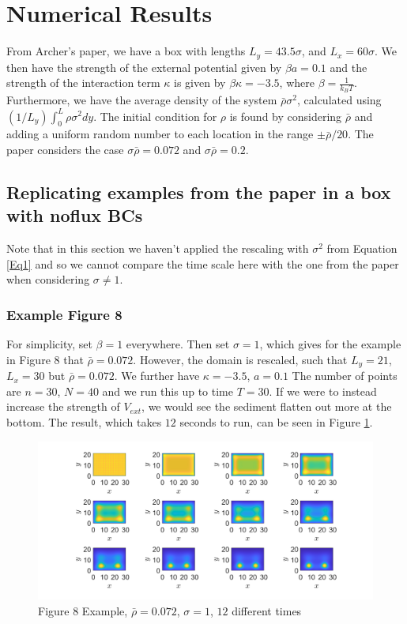 \documentclass[11pt, a4paper]{article}
\theoremstyle{definition}
\begin{document}
\section{Numerical Results}
From Archer's paper, we have a box with lengths $L_y = 43.5 \sigma$, and $L_x = 60 \sigma$. 
We then have the strength of the external potential given by $\beta a = 0.1$ and the strength of the interaction term $\kappa$ is given by $\beta \kappa = - 3.5$, where $\beta = \frac{1}{k_BT}$. 
Furthermore, we have the average density of the system $\bar \rho \sigma^2$, calculated using $(1/L_y)\int_0^L \rho \sigma^2 dy$.
The initial condition for $\rho$ is found by considering $\bar \rho$ and adding a uniform random number to each location in the range $\pm \bar \rho/ 20$. The paper considers the case $\sigma \bar \rho = 0.072$ and $\sigma \bar \rho = 0.2$.
\subsection{Replicating examples from the paper in a box with noflux BCs}
Note that in this section we haven't applied the rescaling with $\sigma^2$ from Equation \eqref{Eq1} and so we cannot compare the time scale here with the one from the paper when considering $\sigma \neq 1$.
\subsubsection{Example Figure 8}

For simplicity, set $\beta = 1$ everywhere. Then set $\sigma = 1$, which gives for the example in Figure 8 that $\bar \rho = 0.072$. However, the domain is rescaled, such that $L_y = 21$, $L_x = 30$ but $\bar \rho = 0.072$. We further have $\kappa = - 3.5$, $a = 0.1$
The number of points are $n = 30$, $N = 40$ and we run this up to time $T = 30$. If we were to instead increase the strength of $V_{ext}$, we would see the sediment flatten out more at the bottom. The result, which takes $12$ seconds to run, can be seen in Figure \ref{F1}. 
\begin{figure}[h]
	\centering
	\includegraphics[scale=0.35]{Ex8F1.png}
	\caption{Figure 8 Example, $\bar \rho = 0.072$, $\sigma = 1$, $12$ different times} 
	\label{F1}
\end{figure} 
\end{document}
